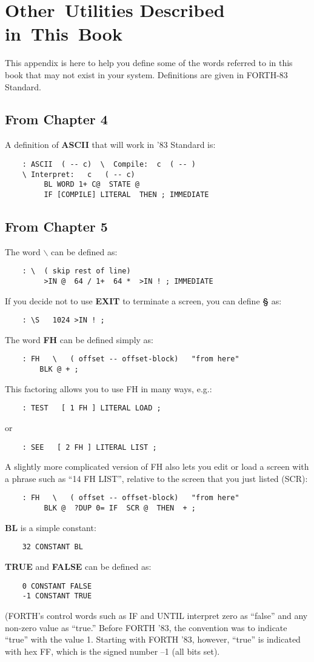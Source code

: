 \chapter{
Other~Utilities
Described
in~This~Book}
This appendix is here to help you define some of the words referred to in 
this book that may not exist in your system.  Definitions are given in
FORTH-83 Standard.
\section{From Chapter 4}
A definition of {\bf ASCII} that will work in '83 Standard is:
\begin{verbatim}
    : ASCII  ( -- c)  \  Compile:  c  ( -- )
    \ Interpret:   c   ( -- c)
         BL WORD 1+ C@  STATE @
         IF [COMPILE] LITERAL  THEN ; IMMEDIATE
\end{verbatim}
\section{From Chapter 5}
The word {\bf $\backslash$} can be defined as:
\begin{verbatim}
    : \  ( skip rest of line)
         >IN @  64 / 1+  64 *  >IN ! ; IMMEDIATE
\end{verbatim}
If you decide not to use {\bf EXIT} to terminate a screen, you can define {\bf \S}
as:
\begin{verbatim}
    : \S   1024 >IN ! ;
\end{verbatim}
The word {\bf FH} can be defined simply as:
\begin{verbatim}
    : FH   \   ( offset -- offset-block)   "from here"
        BLK @ + ;
\end{verbatim}
This factoring allows you to use FH in many ways, e.g.:
\begin{verbatim}
    : TEST   [ 1 FH ] LITERAL LOAD ;
\end{verbatim}
or
\begin{verbatim}
    : SEE   [ 2 FH ] LITERAL LIST ;
\end{verbatim}
A slightly more complicated version of FH also lets you edit or load a 
screen with a phrase such as ``14 FH LIST'', relative to the screen that 
you just listed (SCR):
\begin{verbatim}
    : FH   \   ( offset -- offset-block)   "from here"
         BLK @  ?DUP 0= IF  SCR @  THEN  + ;
\end{verbatim}
{\bf BL} is a simple constant:
\begin{verbatim}
    32 CONSTANT BL
\end{verbatim}
{\bf TRUE} and {\bf FALSE} can be defined as:
\begin{verbatim}
    0 CONSTANT FALSE
    -1 CONSTANT TRUE
\end{verbatim}
(FORTH's control words such as IF and UNTIL interpret zero as ``false'' 
and any non-zero value as ``true.''  Before FORTH '83, the convention
was to indicate ``true'' with the value 1.  Starting with FORTH '83,
however, ``true'' is indicated with hex FF, which is the signed number --1
(all bits set).

